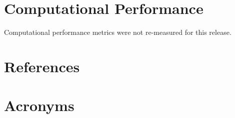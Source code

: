 \documentclass[DM,lsstdraft,toc]{lsstdoc}
\begin{document}
\section{Computational Performance}\label{computational-performance}

Computational performance metrics were not re-measured for this release.

\appendix

\section{References} \label{sec:bib}
\renewcommand{\refname}{} %


\section{Acronyms} \label{sec:acronyms}

\end{document}
